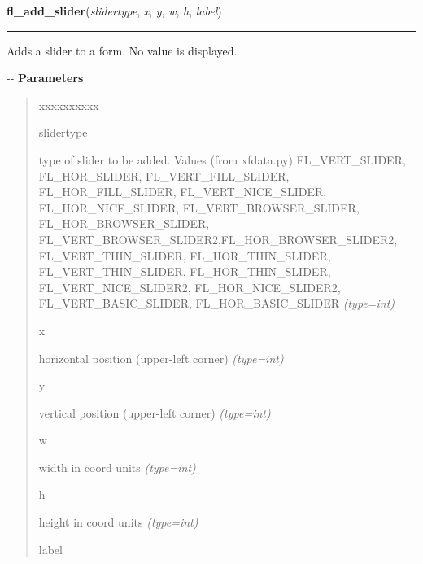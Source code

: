     \vspace{0.5ex}

\hspace{.8\funcindent}\begin{boxedminipage}{\funcwidth}

    \raggedright \textbf{fl\_add\_slider}(\textit{slidertype}, \textit{x}, \textit{y}, \textit{w}, \textit{h}, \textit{label})

    \vspace{-1.5ex}

    \rule{\textwidth}{0.5\fboxrule}
\setlength{\parskip}{2ex}

Adds a slider to a form. No value is displayed.

-{}-
\setlength{\parskip}{1ex}
      \textbf{Parameters}
      \vspace{-1ex}

      \begin{quote}
        \begin{Ventry}{xxxxxxxxxx}

          \item[slidertype]


type of slider to be added. Values (from xfdata.py) FL\_VERT\_SLIDER,
FL\_HOR\_SLIDER, FL\_VERT\_FILL\_SLIDER, FL\_HOR\_FILL\_SLIDER,
FL\_VERT\_NICE\_SLIDER, FL\_HOR\_NICE\_SLIDER, FL\_VERT\_BROWSER\_SLIDER,
FL\_HOR\_BROWSER\_SLIDER, FL\_VERT\_BROWSER\_SLIDER2,FL\_HOR\_BROWSER\_SLIDER2,
FL\_VERT\_THIN\_SLIDER, FL\_HOR\_THIN\_SLIDER, FL\_VERT\_THIN\_SLIDER,
FL\_HOR\_THIN\_SLIDER, FL\_VERT\_NICE\_SLIDER2, FL\_HOR\_NICE\_SLIDER2,
FL\_VERT\_BASIC\_SLIDER, FL\_HOR\_BASIC\_SLIDER
            {\it (type=int)}

          \item[x]


horizontal position (upper-left corner)
            {\it (type=int)}

          \item[y]


vertical position (upper-left corner)
            {\it (type=int)}

          \item[w]


width in coord units
            {\it (type=int)}

          \item[h]


height in coord units
            {\it (type=int)}

          \item[label]



\end{Ventry}
\end{quote}
\end{boxedminipage}
